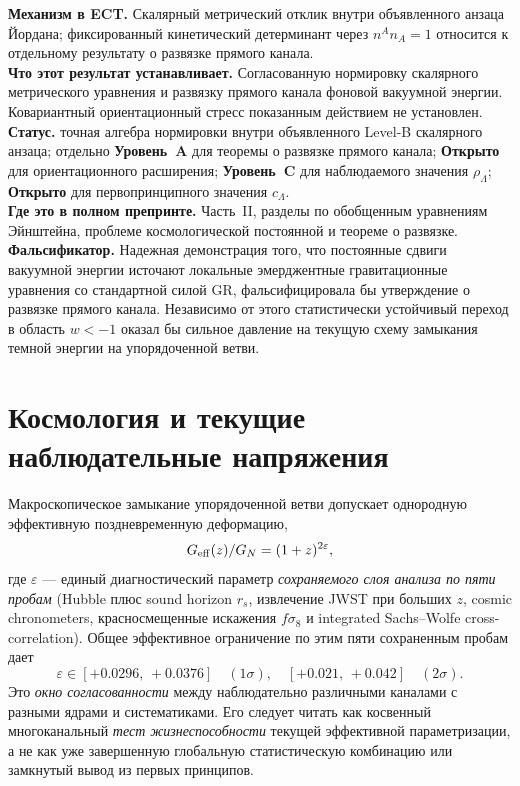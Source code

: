 \documentclass[11pt,a4paper]{article}
\newcommand{\statA}{\textbf{Уровень~A}}
\newcommand{\statC}{\textbf{Уровень~C}}
\newcommand{\statO}{\textbf{Открыто}}
\begin{document}
\begin{mechbox}
\textbf{Механизм в ECT.}
Скалярный метрический отклик внутри объявленного анзаца Йордана;
фиксированный кинетический детерминант через $n^An_A=1$ относится
к отдельному результату о развязке прямого канала.\\
\textbf{Что этот результат устанавливает.} Согласованную
нормировку скалярного метрического уравнения и развязку прямого
канала фоновой вакуумной энергии.  Ковариантный ориентационный
стресс показанным действием не установлен.\\
\textbf{Статус.} точная алгебра нормировки внутри объявленного
Level-B скалярного анзаца; отдельно \statA{} для теоремы о
развязке прямого канала; \statO{} для ориентационного
расширения; \statC{} для наблюдаемого значения $\rho_\Lambda$;
\statO{} для первопринципного значения $c_\Lambda$.\\
\textbf{Где это в полном препринте.} Часть~II, разделы по
обобщенным уравнениям Эйнштейна, проблеме космологической
постоянной и теореме о развязке.\\
\textbf{Фальсификатор.} Надежная демонстрация того, что постоянные
сдвиги вакуумной энергии источают локальные эмерджентные
гравитационные уравнения со стандартной силой GR,
фальсифицировала бы утверждение о развязке прямого канала.
Независимо от этого статистически устойчивый переход в область
$w<-1$ оказал бы сильное давление на текущую схему замыкания
темной энергии на упорядоченной ветви.
\end{mechbox}

\section{Космология и текущие наблюдательные напряжения}
\label{sec:cosmology}

Макроскопическое замыкание упорядоченной ветви допускает
однородную эффективную поздневременную деформацию,
\begin{equation}
  \label{eq:eps_def}
  G_{\rm eff}(z)/G_N = (1+z)^{2\varepsilon},
\end{equation}
где $\varepsilon$ — единый диагностический параметр
\emph{сохраняемого слоя анализа по пяти пробам}
(Hubble плюс sound horizon $r_s$, извлечение JWST при больших $z$,
cosmic chronometers, красносмещенные искажения $f\sigma_8$ и
integrated Sachs--Wolfe cross-correlation). Общее эффективное
ограничение по этим пяти сохраненным пробам дает
\begin{equation}
  \varepsilon\in[+0.0296,\,+0.0376] \quad (1\sigma), \quad
  [+0.021,\,+0.042] \quad (2\sigma).
\end{equation}
Это \emph{окно согласованности} между наблюдательно различными
каналами с разными ядрами и систематиками.
Его следует читать как косвенный многоканальный
\emph{тест жизнеспособности} текущей эффективной параметризации,
а не как уже завершенную глобальную статистическую комбинацию или
замкнутый вывод из первых принципов.
\end{document}
